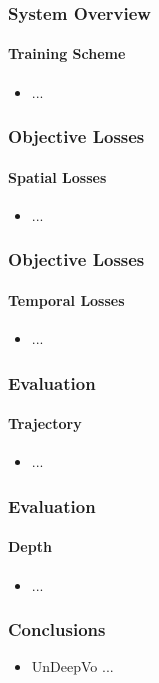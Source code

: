 \documentclass{beamer}
\begin{document}
\begin{frame}
	\frametitle{System Overview}
    \framesubtitle{Training Scheme}
    \begin{itemize}
        \item ...
    \end{itemize}
\end{frame}

\begin{frame}
	\frametitle{Objective Losses}
    \framesubtitle{Spatial Losses}
    \begin{itemize}
        \item ...
    \end{itemize}
\end{frame}

\begin{frame}
	\frametitle{Objective Losses}
    \framesubtitle{Temporal Losses}
    \begin{itemize}
        \item ...
    \end{itemize}
\end{frame}

\begin{frame}
	\frametitle{Evaluation}
    \framesubtitle{Trajectory}
    \begin{itemize}
        \item ...
    \end{itemize}
\end{frame}

\begin{frame}
	\frametitle{Evaluation}
    \framesubtitle{Depth}
    \begin{itemize}
        \item ...
    \end{itemize}
\end{frame}

\begin{frame}
    \frametitle{Conclusions}
    \begin{itemize}
        \item UnDeepVo ...
    \end{itemize}
\end{frame}
\end{document}
